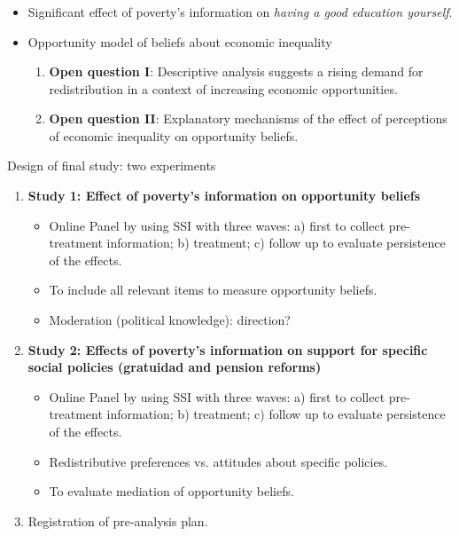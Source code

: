 \documentclass{beamer}
\begin{document}
\begin{frame} [allowframebreaks]
\frametitle{}

\begin{itemize}
\justifying
\item Significant effect of poverty's information on \textit{having a good education yourself}. 
\medskip
\medskip
\medskip
\item Opportunity model of beliefs about economic inequality
\medskip
	\begin{enumerate}
	\justifying
	\item \textbf{Open question I}: Descriptive analysis suggests a rising demand for redistribution in a context of {\color{red}increasing economic opportunities}.
    \medskip
    \item \textbf{Open question II}: Explanatory mechanisms of the effect of perceptions of economic inequality on opportunity beliefs.
	\end{enumerate}
\end{itemize}

\end{frame}



\begin{frame}{Design of final study: two experiments}

\begin{enumerate}
\justifying
\item \textbf{Study 1: Effect of poverty's information on opportunity beliefs}
	\begin{itemize}
	\justifying
	\item Online Panel by using SSI with three waves: a) first to collect pre-treatment information; b) treatment; c) follow up to evaluate persistence of the effects.
	\medskip
	\item To include all relevant items to measure opportunity beliefs.
	\medskip
	\item Moderation (political knowledge): direction? 
	\end{itemize}
\medskip
\item \textbf{Study 2: Effects of poverty's information on support for specific social policies (gratuidad and pension reforms)}
	\begin{itemize}
	\justifying
	\item Online Panel by using SSI with three waves: a) first to collect pre-treatment information; b) treatment; c) follow up to evaluate persistence of the effects.
	\medskip
	\item Redistributive preferences vs. attitudes about specific policies.
	\medskip
	\item To evaluate mediation of opportunity beliefs.
	\medskip
	\end{itemize}
\medskip
\item Registration of pre-analysis plan.	
\end{enumerate}	



\end{frame}
\end{document}
